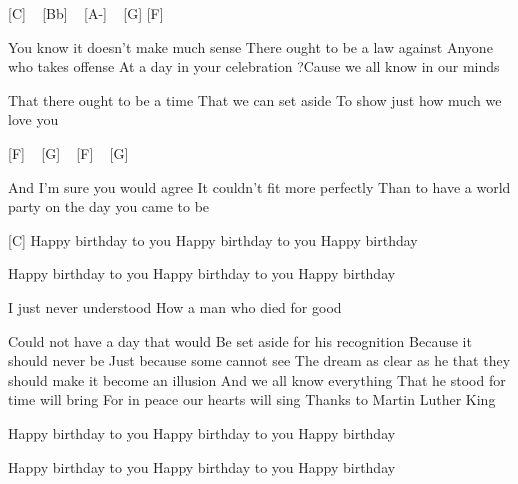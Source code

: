 
[C] ~ [Bb] ~ [A-] ~ [G] [F]

You know it doesn't make much sense
There ought to be a law against
Anyone who takes offense
At a day in your celebration
?Cause we all know in our minds

That there ought to be a time
That we can set aside
To show just how much we love you

[F] ~ [G] ~ [F] ~ [G] ~

And I'm sure you would agree
It couldn't fit more perfectly
Than to have a world party on the day you came to be

[C]
Happy birthday to you
Happy birthday to you
Happy birthday

Happy birthday to you
Happy birthday to you
Happy birthday

I just never understood
How a man who died for good

Could not have a day that would
Be set aside for his recognition
Because it should never be
Just because some cannot see
The dream as clear as he
that they should make it become an illusion
And we all know everything
That he stood for time will bring
For in peace our hearts will sing
Thanks to Martin Luther King

Happy birthday to you
Happy birthday to you
Happy birthday

Happy birthday to you
Happy birthday to you
Happy birthday 